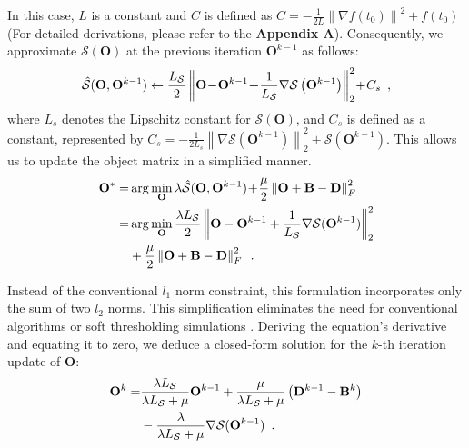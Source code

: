 \documentclass[10pt,journal,compsoc]{IEEEtran}
\begin{document}
In this case, $L$ is a constant and $C$ is defined as $C =  - \frac{1}{{2{L}}}{\left\| \nabla{f({t_0})} \right\|^2} + f({t_0})$ (For detailed derivations, please refer to the \textbf{Appendix A}). Consequently, we approximate $\mathcal{S}(\mathbf{O})$ at the previous iteration $\mathbf{O}^{k-1}$ as follows:
\begin{equation}
\setlength{\abovedisplayskip}{1pt}
\setlength{\belowdisplayskip}{2pt}
    \mathcal{\hat{S}}(\mathbf{O}, \mathbf{O}^{k-1}) \leftarrow \frac{L_{\mathcal{S}}}{2} \left\| \mathbf{O}\!-\!\mathbf{O}^{k-1}\!+\!\frac{1}{L_{\mathcal{S}}} \nabla \mathcal{S} \left( \mathbf{O}^{k-1} \right) \right\|^2_2\!+\!C_s \enspace,
\end{equation}
where $L_s$ denotes the Lipschitz constant for $\mathcal{S}(\mathbf{O})$, and $C_s$ is defined as a constant, represented by $C_s=-\frac{1}{{2{L_s}}}{\left\| {\nabla\mathcal{S}({\mathbf{O}^{k - 1}})} \right\|_2^2} + \mathcal{S}({\mathbf{O}^{k - 1}})$. This allows us to update the object matrix in a simplified manner.
\begin{equation}
\setlength{\abovedisplayskip}{1pt}
\setlength{\belowdisplayskip}{1pt}
\begin{aligned}
{\mathbf{O}^*} =& \arg \mathop {\min }\limits_\mathbf{O} \lambda \hat{\mathcal{S}}(\mathbf{O},{\mathbf{O}^{k - 1}})\!+\!\frac{\mu }{2}\left\| {\mathbf{O} + \mathbf{B} - \mathbf{D}} \right\|_F^2\\
 =& \arg \min \limits_{\mathbf{O}} \frac{\lambda{{L_\mathcal{S}}}}{2}\left\| {\mathbf{O} - {\mathbf{O}^{k - 1}} + \frac{1}{{{L_\mathcal{S}}}}\nabla \mathcal{S}({\mathbf{O}^{k - 1}})} \right\|_2^2 \\
 &+ \frac{\mu }{2}\left\| {\mathbf{O} + \mathbf{B} - \mathbf{D}} \right\|_F^2 \enspace.
\end{aligned}
\label{optT}
\end{equation}

Instead of the conventional \( l_1 \) norm constraint, this formulation incorporates only the sum of two $l_2$ norms. This simplification eliminates the need for conventional algorithms or soft thresholding simulations \cite{zhang-2018-istanet}. Deriving the equation's derivative and equating it to zero, we deduce a closed-form solution for the \( k \)-th iteration update of \(\mathbf{O}\):
\begin{equation}
\setlength{\abovedisplayskip}{1pt}
\setlength{\belowdisplayskip}{1pt}
\begin{aligned}
\mathbf{O}^{k} = & \frac{\lambda L_{\mathcal{S}}}{\lambda L_{\mathcal{S}} + \mu} \mathbf{O}^{k-1} + \frac{\mu}{\lambda L_{\mathcal{S}} + \mu} \left( \mathbf{D}^{k - 1} - \mathbf{B}^{k} \right)\\ 
&- \frac{\lambda}{\lambda L_{\mathcal{S}} + \mu} \nabla \mathcal{S}(\mathbf{O}^{k-1}) \enspace.
\end{aligned}
\label{closed}
\end{equation}
\end{document}
